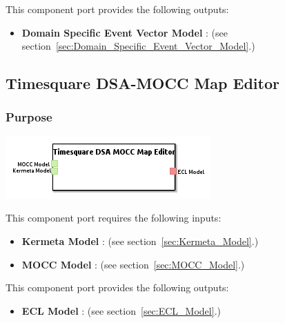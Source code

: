 \documentclass{gemoc} %
\begin{document}
This component port provides the following outputs:
\begin{itemize}
  \item \textbf{Domain Specific Event Vector Model} :
(see section~\ref{sec:Domain_Specific_Event_Vector_Model}.)
\end{itemize}


\subsection{Timesquare DSA-MOCC Map Editor}
\label{sec:Timesquare_DSA-MOCC_Map_Editor}


\subsubsection{Purpose}


\begin{center}
\includegraphics*[trim=0.0cm 0.0cm 0cm 0.0cm, clip=true]{../images/generated/Generated_Timesquare_DSA-MOCC_Map_Editor.png}
\end{center}

This component port requires the following inputs:
\begin{itemize}
  \item \textbf{Kermeta Model} :
(see section~\ref{sec:Kermeta_Model}.)
  \item \textbf{MOCC Model} :
(see section~\ref{sec:MOCC_Model}.)
\end{itemize}

This component port provides the following outputs:
\begin{itemize}
  \item \textbf{ECL Model} :
(see section~\ref{sec:ECL_Model}.)
\end{itemize}
\end{document}

